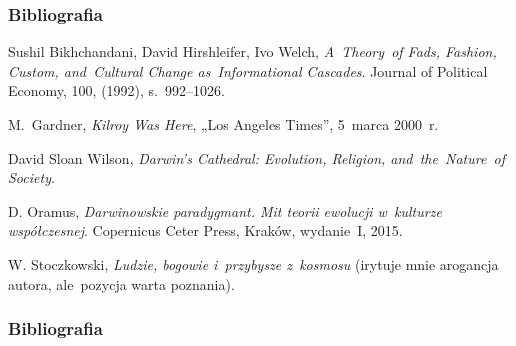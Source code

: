 \documentclass[10pt,t]{beamer}
\begin{document}
\begin{frame}
  \frametitle{Bibliografia}


  Sushil Bikhchandani, David Hirshleifer, Ivo Welch,
  \textit{A~Theory~of Fads, Fashion, Custom, and~Cultural Change
    as~Informational Cascades}. Journal of Political Economy,
  100, (1992), s.~992--1026.

  M.~Gardner, \textit{Kilroy Was Here}, „Los Angeles Times”, 5~marca 2000~r.

  David Sloan Wilson, \textit{Darwin's Cathedral: Evolution,
    Religion, and~the~Nature~of Society}.

  D. Oramus, \textit{Darwinowskie paradygmant. Mit teorii
    ewolucji w~kulturze współczesnej}. Copernicus Ceter Press,
  Kraków, wydanie~I, 2015.

  W. Stoczkowski, \textit{Ludzie, bogowie i~przybysze
    z~kosmosu} (irytuje mnie arogancja autora, ale~pozycja warta
  poznania).

\end{frame}










\begin{frame}
  \frametitle{Bibliografia}


  

  {}

\end{frame}






\end{document}
